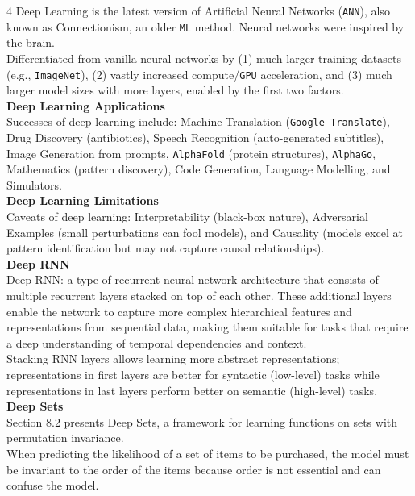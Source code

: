 \documentclass[8pt]{extarticle}
\begin{document}
\begin{multicols}{4}
Deep Learning is the latest version of Artificial Neural Networks (\texttt{ANN}), also known as Connectionism, an older \texttt{ML} method. Neural networks were inspired by the brain.\\
Differentiated from vanilla neural networks by (1) much larger training datasets (e.g., \texttt{ImageNet}), (2) vastly increased compute/\texttt{GPU} acceleration, and (3) much larger model sizes with more layers, enabled by the first two factors.\\
\vspace{2pt}\textbf{Deep Learning Applications}\\
Successes of deep learning include: Machine Translation (\texttt{Google Translate}), Drug Discovery (antibiotics), Speech Recognition (auto-generated subtitles), Image Generation from prompts, \texttt{AlphaFold} (protein structures), \texttt{AlphaGo}, Mathematics (pattern discovery), Code Generation, Language Modelling, and Simulators.\\
\vspace{2pt}\textbf{Deep Learning Limitations}\\
Caveats of deep learning: Interpretability (black-box nature), Adversarial Examples (small perturbations can fool models), and Causality (models excel at pattern identification but may not capture causal relationships).\\
\vspace{2pt}\textbf{Deep RNN}\\
Deep RNN: a type of recurrent neural network architecture that consists of multiple recurrent layers stacked on top of each other. These additional layers enable the network to capture more complex hierarchical features and representations from sequential data, making them suitable for tasks that require a deep understanding of temporal dependencies and context.\\
Stacking RNN layers allows learning more abstract representations; representations in first layers are better for syntactic (low-level) tasks while representations in last layers perform better on semantic (high-level) tasks.\\
\vspace{2pt}\textbf{Deep Sets}\\
Section 8.2 presents Deep Sets, a framework for learning functions on sets with permutation invariance.\\
When predicting the likelihood of a set of items to be purchased, the model must be invariant to the order of the items because order is not essential and can confuse the model.\\

\end{multicols}
\end{document}
